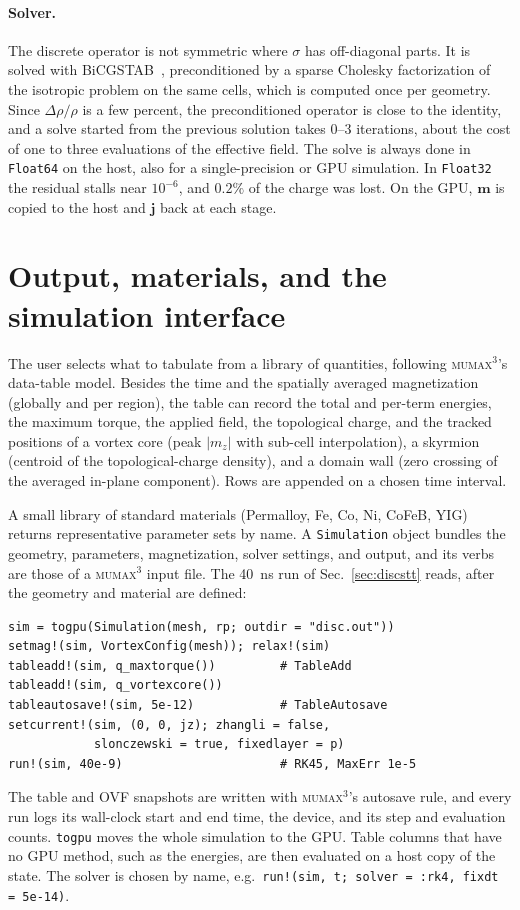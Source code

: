 \documentclass{article}      %
\newcommand{\mumax}{\textsc{mumax}$^3$}
\newcommand{\vm}{\bm{m}}
\begin{document}
\paragraph{Solver.}
The discrete operator is not symmetric where $\sigma$ has off-diagonal parts. It is
solved with BiCGSTAB~\cite{vandervorst1992}, preconditioned by a sparse Cholesky
factorization of the isotropic problem on the same cells, which is computed once
per geometry. Since $\Delta\rho/\rho$ is a few percent, the preconditioned operator
is close to the identity, and a solve started from the previous solution takes
$0$--$3$ iterations, about the cost of one to three evaluations of the effective
field. The solve is always done in \texttt{Float64} on the host, also for a
single-precision or GPU simulation. In \texttt{Float32} the residual stalls near
$10^{-6}$, and $0.2\%$ of the charge was lost. On the GPU, $\vm$ is copied to the
host and $\bm{j}$ back at each stage.

\section{Output, materials, and the simulation interface}
\label{sec:interface}

The user selects what to tabulate from a library of quantities, following
\mumax's data-table model. Besides the time and the spatially averaged
magnetization (globally and per region), the table can record the total and
per-term energies, the maximum torque, the applied field, the topological charge,
and the tracked positions of a vortex core (peak $|m_z|$ with sub-cell
interpolation), a skyrmion (centroid of the topological-charge density), and a
domain wall (zero crossing of the averaged in-plane component). Rows are appended
on a chosen time interval.

A small library of standard materials (Permalloy, Fe, Co, Ni, CoFeB, YIG) returns
representative parameter sets by name. A \texttt{Simulation} object bundles the
geometry, parameters, magnetization, solver settings, and output, and its verbs
are those of a \mumax{} input file. The 40~ns run of Sec.~\ref{sec:discstt}
reads, after the geometry and material are defined:
%
\begin{lstlisting}
sim = togpu(Simulation(mesh, rp; outdir = "disc.out"))
setmag!(sim, VortexConfig(mesh)); relax!(sim)
tableadd!(sim, q_maxtorque())         # TableAdd
tableadd!(sim, q_vortexcore())
tableautosave!(sim, 5e-12)            # TableAutosave
setcurrent!(sim, (0, 0, jz); zhangli = false,
            slonczewski = true, fixedlayer = p)
run!(sim, 40e-9)                      # RK45, MaxErr 1e-5
\end{lstlisting}
%
The table and OVF snapshots are written with \mumax's autosave rule, and every
run logs its wall-clock start and end time, the device, and its step and
evaluation counts. \texttt{togpu} moves the whole simulation to the GPU. Table
columns that have no GPU method, such as the energies, are then evaluated on a
host copy of the state. The solver is chosen by name, e.g.\
\texttt{run!(sim, t; solver = :rk4, fixdt = 5e-14)}.
\end{document}
